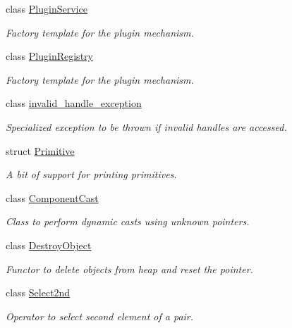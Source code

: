 \begin{DoxyCompactItemize}
class \hyperlink{class_d_d4hep_1_1_plugin_service}{PluginService}
\begin{DoxyCompactList}\small\item\em Factory template for the plugin mechanism. \item\end{DoxyCompactList}\item 
class \hyperlink{class_d_d4hep_1_1_plugin_registry}{PluginRegistry}
\begin{DoxyCompactList}\small\item\em Factory template for the plugin mechanism. \item\end{DoxyCompactList}\item 
class \hyperlink{class_d_d4hep_1_1invalid__handle__exception}{invalid\_\-handle\_\-exception}
\begin{DoxyCompactList}\small\item\em Specialized exception to be thrown if invalid handles are accessed. \item\end{DoxyCompactList}\item 
struct \hyperlink{struct_d_d4hep_1_1_primitive}{Primitive}
\begin{DoxyCompactList}\small\item\em A bit of support for printing primitives. \item\end{DoxyCompactList}\item 
class \hyperlink{class_d_d4hep_1_1_component_cast}{ComponentCast}
\begin{DoxyCompactList}\small\item\em Class to perform dynamic casts using unknown pointers. \item\end{DoxyCompactList}\item 
class \hyperlink{class_d_d4hep_1_1_destroy_object}{DestroyObject}
\begin{DoxyCompactList}\small\item\em Functor to delete objects from heap and reset the pointer. \item\end{DoxyCompactList}\item 
class \hyperlink{class_d_d4hep_1_1_select2nd}{Select2nd}
\begin{DoxyCompactList}\small\item\em Operator to select second element of a pair. \item\end{DoxyCompactList}\item 

\end{DoxyCompactItemize}
